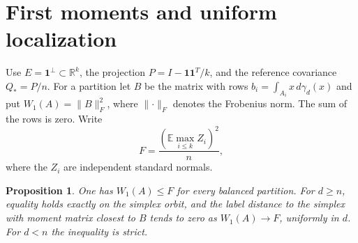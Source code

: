\documentclass[11pt,reqno]{amsart}
\newtheorem{proposition}[theorem]{Proposition}
\newcommand{\R}{\mathbb R}
\newcommand{\E}{\mathbb E}
\newcommand{\one}{\mathbf 1}
\newcommand{\norm}[1]{\lVert #1\rVert}
\newcommand{\ga}{\gamma}
\begin{document}
\section{First moments and uniform localization}\label{sec:alignment}

Use $E=\one^\perp\subset\R^k$, the projection $P=I-\one\one^T/k$,
and the reference covariance $Q_*=P/n$. For a partition let $B$ be the
matrix with rows $b_i=\int_{A_i}x\,d\ga_d(x)$ and put
$W_1(A)=\norm B_F^2$, where $\norm{\cdot}_F$ denotes the Frobenius norm.
The sum of the rows is zero. Write
\[
 F=\frac{(\E\max_{i\le k}Z_i)^2}{n},
\]
where the $Z_i$ are independent standard normals.

\begin{proposition}\label{prop:zhang}
One has $W_1(A)\le F$ for every balanced partition. For $d\ge n$,
equality holds exactly on the simplex orbit, and the label distance
to the simplex with moment matrix closest to $B$ tends to zero as
$W_1(A)\to F$, uniformly in $d$. For $d<n$ the inequality is strict.
\end{proposition}
\end{document}
